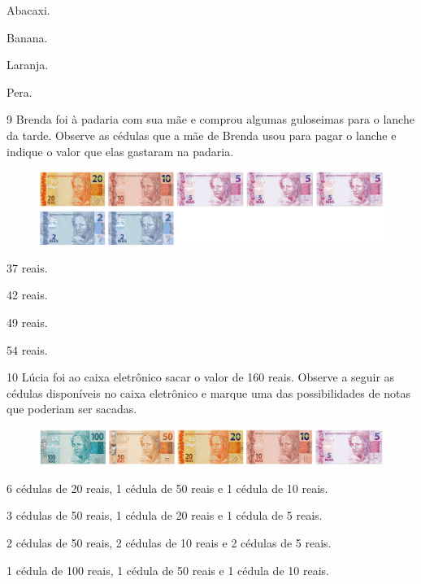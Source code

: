 \pagebreak
\begin{multicols}{2}
\begin{escolha}[itemsep=-5pt]
\item Abacaxi.

\item Banana.

\item Laranja.

\item Pera.
\end{escolha}
\end{multicols}

\num{9} Brenda foi à padaria com sua mãe e comprou algumas guloseimas para o
lanche da tarde. Observe as cédulas que a mãe de Brenda usou para pagar
o lanche e indique o valor que elas gastaram na padaria.

\begin{figure}[H]
\includegraphics[width=\textwidth]{./media/image145.png}
\end{figure}

\begin{escolha}[itemsep=-5pt]
\item 37 reais.

\item 42 reais.

\item 49 reais.

\item 54 reais.
\end{escolha}

\num{10} Lúcia foi ao caixa eletrônico sacar o valor de 160 reais. Observe a seguir
as cédulas disponíveis no caixa eletrônico e marque uma das
possibilidades de notas que poderiam ser sacadas.

\begin{figure}[H]
\includegraphics[width=\textwidth]{./media/image146.png}
\end{figure}

\begin{escolha}[itemsep=-5pt]
\item 6 cédulas de 20 reais, 1 cédula de 50 reais e 1 cédula de 10 reais.

\item 3 cédulas de 50 reais, 1 cédula de 20 reais e 1 cédula de 5 reais.

\item 2 cédulas de 50 reais, 2 cédulas de 10 reais e 2 cédulas de 5 reais.

\item 1 cédula de 100 reais, 1 cédula de 50 reais e 1 cédula de 10 reais.
\end{escolha}

